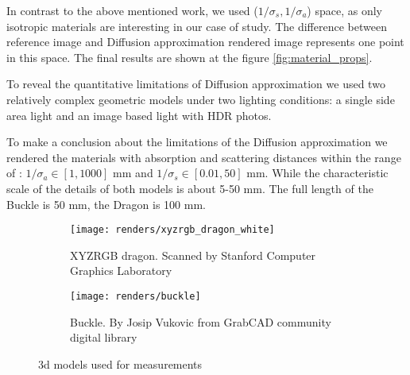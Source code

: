 In contrast to the above mentioned work, we used ($1/\sigma_s, 1/\sigma_a$) space, as only
isotropic materials are interesting in our case of study. The difference between reference image and
Diffusion approximation rendered image represents one point in this space. The final results are
shown at the figure \ref{fig:material_props}.

To reveal the quantitative limitations of Diffusion approximation we used two relatively complex
geometric models under two lighting conditions: a single side area light and an image based light
with HDR photos.

To make a conclusion about the limitations of the Diffusion approximation we rendered the
materials with absorption and scattering distances within the range of : $1/\sigma_a \in
[1,1000]$ mm and $1/\sigma_s \in [0.01,50]$ mm. While the characteristic scale of the details of
both models is about 5-50 mm. The full length of the Buckle is 50 mm, the Dragon is 100 mm.

\begin{figure}[h]
    \centering
    \begin{subfigure}{0.48\textwidth}
        \texttt{[image: renders/xyzrgb\_dragon\_white]}
        \caption{XYZRGB dragon. Scanned by Stanford Computer Graphics Laboratory}
    \end{subfigure}
    \begin{subfigure}{0.48\textwidth}
        \texttt{[image: renders/buckle]}
        \caption{Buckle. By Josip Vukovic from GrabCAD community digital library}
    \end{subfigure}
    \caption{3d models used for measurements}
    \label{fig:measurements_models}
\end{figure}

